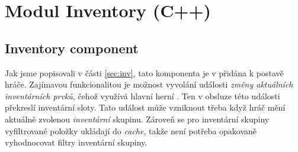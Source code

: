 


\section{Modul Inventory (C++)}


\subsection{Inventory component}

Jak jsme popisovali v části \ref{sec:inv}, tato komponenta je v \UEu{} přidána k postavě hráče. Zajímavou funkcionalitou je možnost vyvolání události \textit{změny aktuálních inventárních prvků}, čehož využívá hlavní herní \HUD{}. Ten v obsluze této události překreslí inventární sloty. Tato událost může vzniknout třeba když hráč mění aktuálně zvolenou \textit{inventární} skupinu. Zároveň se pro inventární skupiny vyfiltrované položky ukládají do \textit{cache}, takže není potřeba opakovaně vyhodnocovat filtry inventární skupiny.
